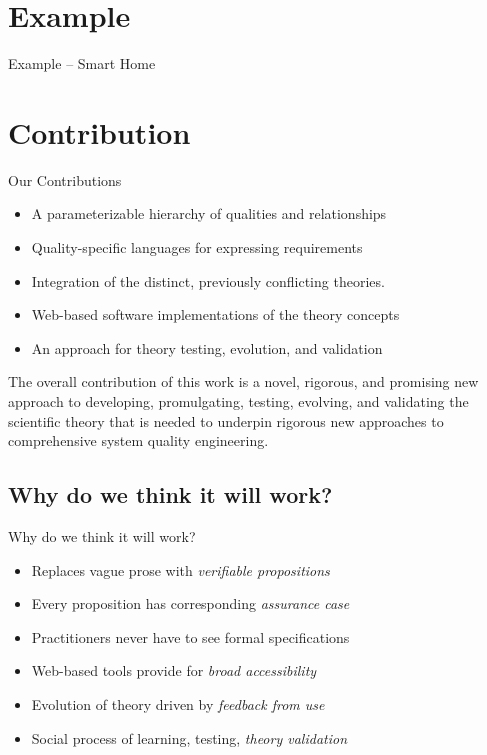 \documentclass[xcolor=x11names,compress]{beamer}
\renewcommand{\(}{\begin{columns}}
\renewcommand{\)}{\end{columns}}
\newcommand{\<}[1]{\begin{column}{#1}}
\renewcommand{\>}{\end{column}}
\begin{document}
\section{Example}
\begin{frame}{Example -- Smart Home}

\end{frame}

\section{Contribution}
\begin{frame}{Our Contributions}
\begin{itemize}
		\item A parameterizable hierarchy of qualities and relationships
		\item Quality-specific languages for expressing  requirements
		\item Integration of the distinct, previously conflicting theories.
		\item Web-based software implementations of the theory concepts
		\item An approach for theory testing, evolution, and validation
\end{itemize}
\vspace{0.5cm}		
		The overall contribution of this work is a novel, rigorous, and promising new approach to developing, promulgating, testing, evolving, and validating the scientific theory that is needed to underpin rigorous new approaches to comprehensive system quality engineering.
\end{frame}


\subsection{Why do we think it will work?}
\begin{frame}{Why do we think it will work?}
\begin{itemize}
\item Replaces vague prose with {\em verifiable propositions}
\item Every proposition has corresponding {\em assurance case}
\item Practitioners never have to see formal specifications
\item Web-based tools provide for {\em broad accessibility}
\item Evolution of theory driven by {\em feedback from use}
\item Social process of learning, testing, {\em theory validation}
\end{itemize}
\end{frame}
\end{document}
